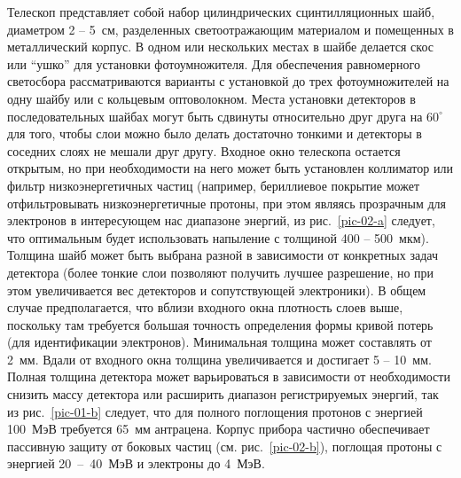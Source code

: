 \documentclass[12pt, a4paper, notitlepage, onecolumn]{article}
\begin{document}
Телескоп представляет собой набор цилиндрических сцинтилляционных шайб, диаметром 2 -- 5~см, разделенных светоотражающим материалом  и помещенных в металлический корпус. В одном или нескольких местах в шайбе делается скос или “ушко” для установки фотоумножителя. Для обеспечения равномерного светосбора рассматриваются варианты с установкой до трех фотоумножителей на одну шайбу или с кольцевым оптоволокном. Места установки детекторов в последовательных шайбах могут быть сдвинуты относительно друг друга на $60^\circ$ для того, чтобы слои можно было делать достаточно тонкими и детекторы в соседних слоях не мешали друг другу. Входное окно телескопа остается открытым, но при необходимости на него может быть установлен коллиматор или фильтр низкоэнергетичных частиц (например, бериллиевое покрытие может отфильтровывать низкоэнергетичные протоны, при этом являясь прозрачным для электронов в  интересующем нас диапазоне энергий, из рис.~\ref{pic-02-a} следует, что оптимальным будет использовать напыление с толщиной 400 -- 500~мкм). Толщина шайб может быть выбрана разной в зависимости от конкретных задач детектора (более тонкие слои позволяют получить лучшее разрешение, но при этом увеличивается вес детекторов и сопутствующей электроники). В общем случае предполагается, что вблизи входного окна плотность слоев выше, поскольку там требуется большая точность определения формы кривой потерь (для идентификации электронов). Минимальная толщина может составлять от 2~мм. Вдали от входного окна толщина увеличивается и достигает 5 -- 10~мм. Полная толщина детектора может варьироваться в зависимости от необходимости снизить массу детектора или расширить диапазон регистрируемых энергий, так из рис.~\ref{pic-01-b} следует, что для полного поглощения протонов с энергией 100~МэВ требуется 65~мм антрацена. Корпус прибора частично обеспечивает пассивную защиту от боковых частиц (см. рис.~\ref{pic-02-b}), поглощая протоны с энергией 20~--~40~МэВ и электроны до 4~МэВ.
\end{document}
